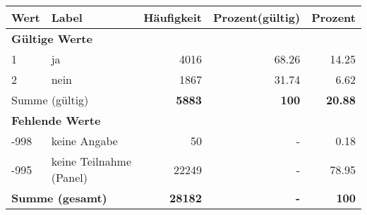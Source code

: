      \begin{longtable}{lXrrr}
     \toprule
     \textbf{Wert} & \textbf{Label} & \textbf{Häufigkeit} & \textbf{Prozent(gültig)} & \textbf{Prozent} \\
     \endhead
     \midrule
     \multicolumn{5}{l}{\textbf{Gültige Werte}}\\

     1 &
     \multicolumn{1}{X}{ ja   } &


       \num{4016} &
       \num[round-mode=places,round-precision=2]{68.26} &
         \num[round-mode=places,round-precision=2]{14.25} \\

     2 &
     \multicolumn{1}{X}{ nein   } &


       \num{1867} &
       \num[round-mode=places,round-precision=2]{31.74} &
         \num[round-mode=places,round-precision=2]{6.62} \\
     \midrule
     \multicolumn{2}{l}{Summe (gültig)} &
       \textbf{\num{5883}} &
     \textbf{\num{100}} &
       \textbf{\num[round-mode=places,round-precision=2]{20.88}} \\
     \multicolumn{5}{l}{\textbf{Fehlende Werte}}\\
       -998 &
       keine Angabe &
         \num{50} &
        - &
         \num[round-mode=places,round-precision=2]{0.18} \\
       -995 &
       keine Teilnahme (Panel) &
         \num{22249} &
        - &
         \num[round-mode=places,round-precision=2]{78.95} \\
     \midrule
     \multicolumn{2}{l}{\textbf{Summe (gesamt)}} &
          \textbf{\num{28182}} &
        \textbf{-} &
        \textbf{\num{100}} \\
     \bottomrule
     \end{longtable}
     
